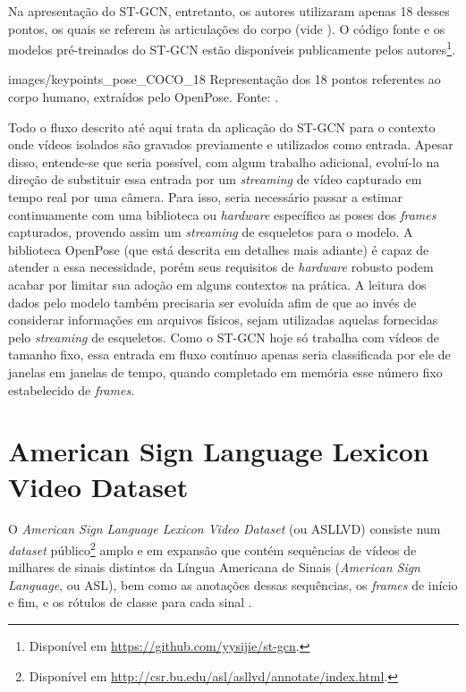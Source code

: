 Na apresentação do ST-GCN, entretanto, os autores utilizaram apenas 18 desses pontos, os quais se referem às articulações do corpo (vide ). O código fonte e os modelos pré-treinados do ST-GCN estão disponíveis publicamente pelos autores\footnote{
    Disponível em \url{https://github.com/yysijie/st-gcn}.
}.

    {images/keypoints_pose_COCO_18}
    {Representação dos 18 pontos referentes ao corpo humano, extraídos pelo OpenPose. Fonte: \cite{openpose-output-2018}.}

Todo o fluxo descrito até aqui trata da aplicação do ST-GCN para o contexto onde vídeos isolados são gravados previamente e utilizados como entrada. Apesar disso, entende-se que seria possível, com algum trabalho adicional, evoluí-lo na direção de substituir essa entrada por um \textit{streaming} de vídeo capturado em tempo real por uma câmera. Para isso, seria necessário passar a estimar continuamente com uma biblioteca ou \textit{hardware} específico as poses dos \textit{frames} capturados, provendo assim um \textit{streaming} de esqueletos para o modelo. A biblioteca OpenPose (que está descrita em detalhes mais adiante) é capaz de atender a essa necessidade, porém seus requisitos de \textit{hardware} robusto podem acabar por limitar sua adoção em alguns contextos na prática. A leitura dos dados pelo modelo também precisaria ser evoluída afim de que ao invés de considerar informações em arquivos físicos, sejam utilizadas aquelas fornecidas pelo \textit{streaming} de esqueletos. Como o ST-GCN hoje só trabalha com vídeos de tamanho fixo, essa entrada em fluxo contínuo apenas seria classificada por ele de janelas em janelas de tempo, quando completado em memória esse número fixo estabelecido de \textit{frames}.


\section{American Sign Language Lexicon Video Dataset} %

O \textit{American Sign Language Lexicon Video Dataset} (ou ASLLVD) consiste num \textit{dataset} público\footnote{
    Disponível em \url{http://csr.bu.edu/asl/asllvd/annotate/index.html}.
} amplo e em expansão que contém sequências de vídeos de milhares de sinais distintos da Língua Americana de Sinais (\textit{American Sign Language}, ou ASL), bem como as anotações dessas sequências, os \textit{frames} de início e fim, e os rótulos de classe para cada sinal \cite{athitsos-asllvd-2008, neidle-2012, vloger-2012}.

